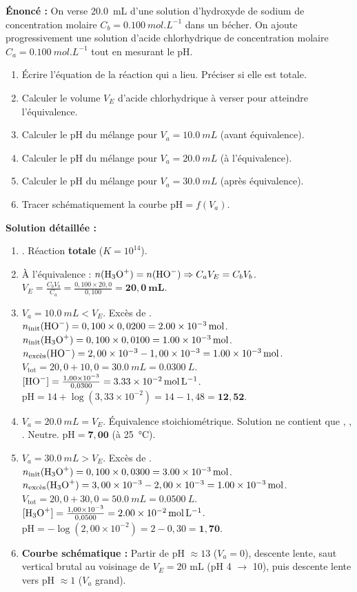 \documentclass[11pt]{article}
\begin{document}
\begin{exoresolu}
\textbf{Énoncé :} On verse \SI{20,0}{mL} d'une solution d'hydroxyde de sodium de concentration molaire $C_b = \SI{0,100}{mol.L^{-1}}$ dans un bécher. On ajoute progressivement une solution d'acide chlorhydrique de concentration molaire $C_a = \SI{0,100}{mol.L^{-1}}$ tout en mesurant le pH.
\begin{enumerate}
  \item Écrire l'équation de la réaction qui a lieu. Préciser si elle est totale.
  \item Calculer le volume $V_{E}$ d'acide chlorhydrique à verser pour atteindre l'équivalence.
  \item Calculer le pH du mélange pour $V_a = \SI{10,0}{mL}$ (avant équivalence).
  \item Calculer le pH du mélange pour $V_a = \SI{20,0}{mL}$ (à l'équivalence).
  \item Calculer le pH du mélange pour $V_a = \SI{30,0}{mL}$ (après équivalence).
  \item Tracer schématiquement la courbe $\mathrm{pH} = f(V_a)$.
\end{enumerate}
\tcblower
\textbf{Solution détaillée :}
\begin{enumerate}
  \item {}. Réaction \textbf{totale} ($K = 10^{14}$).
  \item À l'équivalence : $n(\ce{H3O+}) = n(\ce{HO-}) \Rightarrow C_a V_E = C_b V_b$.
  $V_E = \frac{C_b V_b}{C_a} = \frac{0,100 \times 20,0}{0,100} = \mathbf{20,0\ mL}$.
  \item $V_a = \SI{10,0}{mL} < V_E$. Excès de .
  $n_{\text{init}}(\ce{HO-}) = 0,100 \times 0,0200 = \SI{2,00e-3}{mol}$.
  $n_{\text{init}}(\ce{H3O+}) = 0,100 \times 0,0100 = \SI{1,00e-3}{mol}$.
  $n_{\text{excès}}(\ce{HO-}) = 2,00 \times 10^{-3} - 1,00 \times 10^{-3} = \SI{1,00e-3}{mol}$.
  $V_{\text{tot}} = 20,0 + 10,0 = \SI{30,0}{mL} = \SI{0,0300}{L}$.
  $[\ce{HO-}] = \frac{1,00 \times 10^{-3}}{0,0300} = \SI{3,33e-2}{mol.L^{-1}}$.
  $\mathrm{pH} = 14 + \log(3,33 \times 10^{-2}) = 14 - 1,48 = \mathbf{12,52}$.
  \item $V_a = \SI{20,0}{mL} = V_E$. Équivalence stoichiométrique.
  Solution ne contient que , , . Neutre.
  $\mathrm{pH} = \mathbf{7,00}$ (à \SI{25}{\celsius}).
  \item $V_a = \SI{30,0}{mL} > V_E$. Excès de .
  $n_{\text{init}}(\ce{H3O+}) = 0,100 \times 0,0300 = \SI{3,00e-3}{mol}$.
  $n_{\text{excès}}(\ce{H3O+}) = 3,00 \times 10^{-3} - 2,00 \times 10^{-3} = \SI{1,00e-3}{mol}$.
  $V_{\text{tot}} = 20,0 + 30,0 = \SI{50,0}{mL} = \SI{0,0500}{L}$.
  $[\ce{H3O+}] = \frac{1,00 \times 10^{-3}}{0,0500} = \SI{2,00e-2}{mol.L^{-1}}$.
  $\mathrm{pH} = -\log(2,00 \times 10^{-2}) = 2 - 0,30 = \mathbf{1,70}$.
  \item \textbf{Courbe schématique :} Partir de pH $\approx 13$ ($V_a=0$), descente lente, saut vertical brutal au voisinage de $V_E=20$ mL (pH 4 $\to$ 10), puis descente lente vers pH $\approx 1$ ($V_a$ grand).
\end{enumerate}
\end{exoresolu}
\end{document}
